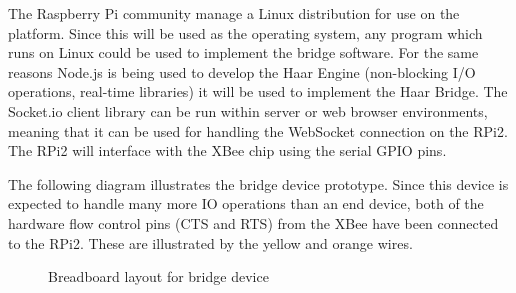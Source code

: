         The Raspberry Pi community manage a Linux distribution for use on the platform. Since this will be used as the operating system, any program which runs on Linux could be used to implement the bridge software. For the same reasons Node.js is being used to develop the Haar Engine (non-blocking I/O operations, real-time libraries) it will be used to implement the Haar Bridge. The Socket.io client library can be run within server or web browser environments, meaning that it can be used for handling the WebSocket connection on the RPi2. The RPi2 will interface with the XBee chip using the serial GPIO pins.

        The following diagram illustrates the bridge device prototype. Since this device is expected to handle many more IO operations than an end device, both of the hardware flow control pins (CTS and RTS) from the XBee have been connected to the RPi2. These are illustrated by the yellow and orange wires.

        \begin{figure}
          \centering
          \caption{Breadboard layout for bridge device}\label{figure:bridge}
        \end{figure}
